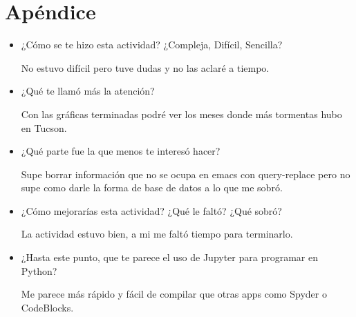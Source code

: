 \documentclass[12pt]{article}
\begin{document}
\section{Ap\'endice}
\begin{itemize}
\item  ¿Cómo se te hizo esta actividad? ¿Compleja, Difícil, Sencilla?

No estuvo dif\'icil pero tuve dudas y no las aclar\'e a tiempo.
\item ¿Qué te llamó más la atención?

Con las gr\'aficas terminadas podr\'e ver los meses donde m\'as tormentas hubo en Tucson.
\item ¿Qué parte fue la que menos te interesó hacer?

Supe borrar informaci\'on que no se ocupa en emacs con query-replace pero no supe como darle la forma de base de datos a lo que me sobr\'o.
\item ¿Cómo mejorarías esta actividad? ¿Qué le faltó? ¿Qué sobró?

La actividad estuvo bien, a mi me falt\'o tiempo para terminarlo.
\item ¿Hasta este punto, que te parece el uso de Jupyter para programar en Python?  

Me parece m\'as r\'apido y f\'acil de compilar que otras apps como Spyder o CodeBlocks. 
\end{itemize}
\end{document}
